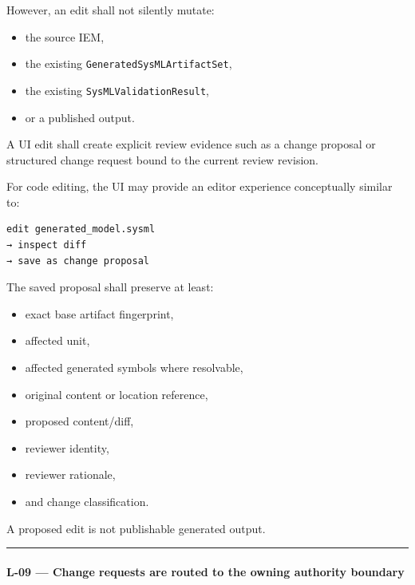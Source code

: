 However, an edit shall not silently mutate:

\begin{itemize}
\tightlist
\item
  the source IEM,
\item
  the existing \texttt{GeneratedSysMLArtifactSet},
\item
  the existing \texttt{SysMLValidationResult},
\item
  or a published output.
\end{itemize}

A UI edit shall create explicit review evidence such as a change proposal or structured change request bound to the current review revision.

For code editing, the UI may provide an editor experience conceptually similar to:

\begin{verbatim}
edit generated_model.sysml
→ inspect diff
→ save as change proposal
\end{verbatim}

The saved proposal shall preserve at least:

\begin{itemize}
\tightlist
\item
  exact base artifact fingerprint,
\item
  affected unit,
\item
  affected generated symbols where resolvable,
\item
  original content or location reference,
\item
  proposed content/diff,
\item
  reviewer identity,
\item
  reviewer rationale,
\item
  and change classification.
\end{itemize}

A proposed edit is not publishable generated output.

\begin{center}\rule{0.5\linewidth}{0.5pt}\end{center}

\hypertarget{l-09--change-requests-are-routed-to-the-owning-authority-boundary}{%
\paragraph{L-09 --- Change requests are routed to the owning authority boundary}\label{l-09--change-requests-are-routed-to-the-owning-authority-boundary}}

